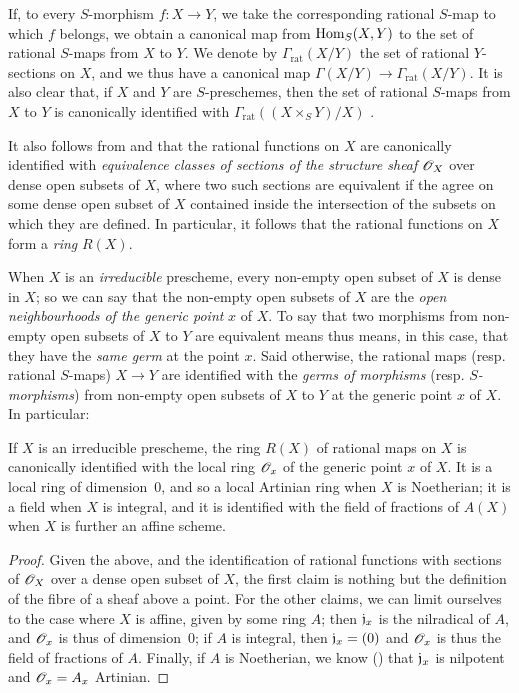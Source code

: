If, to every $S$-morphism $f\colon X\to Y$, we take the corresponding rational $S$-map to which $f$ belongs, we obtain a canonical map from ${\mathop{\mathrm{Hom}}\nolimits}_S(X,Y)$ to the set of rational $S$-maps from $X$ to $Y$.
We denote by $\Gamma_\mathrm{rat}(X/Y)$ the set of rational $Y$-sections on $X$, and we thus have a canonical map $\Gamma(X/Y)\to\Gamma_\mathrm{rat}(X/Y)$.
It is also clear that, if $X$ and $Y$ are $S$-preschemes, then the set of rational $S$-maps from $X$ to $Y$ is canonically identified with $\Gamma_\mathrm{rat}((X\times_S Y)/X)$ .

\begin{env}[7.1.3]
\label{1.7.1.3}
It also follows from  and  that the rational functions on $X$ are canonically identified with \emph{equivalence classes of sections of the structure sheaf $\mathscr{O}_X$} over dense open subsets of $X$, where two such sections are equivalent if the agree on some dense open subset of $X$ contained inside the intersection of the subsets on which they are defined.
In particular, it follows that the rational functions on $X$ form a \emph{ring} $R(X)$.
\end{env}

\begin{env}[7.1.4]
\label{1.7.1.4}
When $X$ is an \emph{irreducible} prescheme, every non-empty open subset of $X$ is dense in $X$; so we can say that the non-empty open subsets of $X$ are the \emph{open neighbourhoods of the generic point} $x$ of $X$.
To say that two morphisms from non-empty open subsets of $X$ to $Y$ are equivalent means thus means, in this case, that they have the \emph{same germ} at the point $x$.
Said otherwise, the rational maps (resp. rational $S$-maps) $X\to Y$ are identified with the \emph{germs of morphisms} (resp. \emph{$S$-morphisms}) from non-empty open subsets of $X$ to $Y$ at the generic point $x$ of $X$.
In particular:
\end{env}

\begin{prop}[7.1.5]
\label{1.7.1.5}
If $X$ is an irreducible prescheme, the ring $R(X)$ of rational maps on $X$ is canonically identified with the local ring $\mathscr{O}_x$ of the generic point $x$ of $X$.
It is a local ring of dimension~0, and so a local Artinian ring when $X$ is Noetherian; it is a field when $X$ is integral, and it is identified with the field of fractions of $A(X)$ when $X$ is further an affine scheme.
\end{prop}

\begin{proof}
\label{proof-1.7.1.5}
Given the above, and the identification of rational functions with sections of $\mathscr{O}_X$ over a dense open subset of $X$, the first claim is nothing but the definition of the fibre of a sheaf above a point.
For the other claims, we can limit ourselves to the case where $X$ is affine, given by some ring $A$; then $\mathfrak{j}_x$ is the nilradical of $A$, and $\mathscr{O}_x$ is thus of dimension~0; if $A$ is integral, then $\mathfrak{j}_x=(0)$ and $\mathscr{O}_x$ is thus the field of fractions of $A$.
Finally, if $A$ is Noetherian, we know (\cite[p.~127, cor.~4]{I-11}) that $\mathfrak{j}_x$ is nilpotent and $\mathscr{O}_x=A_x$ Artinian.
\end{proof}

